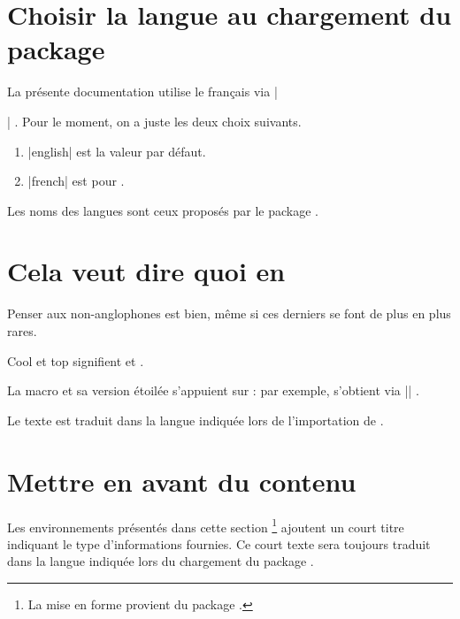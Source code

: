 \section{Choisir la langue au chargement du package}

La présente documentation utilise le français via \tdocinlatex|\usepackage[lang = french]{tutodoc}| .
Pour le moment, on a juste les deux choix suivants.

\begin{enumerate}
    \item \tdocinlatex|english| est la valeur par défaut.

    \item \tdocinlatex|french| est pour .
\end{enumerate}


\begin{tdocnote}
    Les noms des langues sont ceux proposés par le package .
\end{tdocnote}


\section{Cela veut dire quoi en }

Penser aux non-anglophones est bien, même si ces derniers se font de plus en plus rares.


\begin{tdoclatex}
Cool et top signifient  et .
\end{tdoclatex}


La macro  et sa version étoilée s'appuient sur  : par exemple,  s'obtient via \tdocinlatex|| .


\begin{tdocnote}
    Le texte  est traduit dans la langue indiquée lors de l'importation de .
\end{tdocnote}


\section{Mettre en avant du contenu}

\begin{tdocnote}
    Les environnements présentés dans cette section
    \footnote{
        La mise en forme provient du package .
    }
    ajoutent un court titre indiquant le type d'informations fournies.
    Ce court texte sera toujours traduit dans la langue indiquée lors du chargement du package .
\end{tdocnote}


